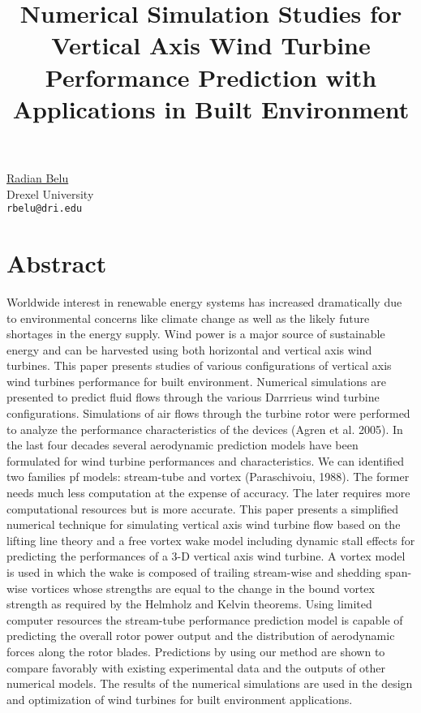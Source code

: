 \title{Numerical Simulation Studies for Vertical Axis Wind Turbine Performance Prediction with Applications in Built Environment}
\author{} \institute{}
\maketitle

\begin{center}
{\large \underline{Radian Belu}}\\
Drexel University\\
{\tt rbelu@dri.edu}
\end{center}

\section*{Abstract}
Worldwide interest in renewable energy systems has increased dramatically due to environmental concerns like climate change as well as the likely future shortages in the energy supply. Wind power is a major source of sustainable energy and can be harvested using both horizontal and vertical axis wind turbines. This paper presents studies of various configurations of vertical axis wind turbines performance for built environment. Numerical simulations are presented to predict fluid flows through the various Darrrieus wind turbine configurations. Simulations of air flows through the turbine rotor were performed to analyze the performance characteristics of the devices (Agren et al. 2005). In the last four decades several aerodynamic prediction models have been formulated for wind turbine performances and characteristics. We can identified two families pf models: stream-tube and vortex (Paraschivoiu, 1988). The former needs much less computation at the expense of accuracy. The later requires more computational resources but is more accurate. This paper presents a simplified numerical technique for simulating vertical axis wind turbine flow based on the lifting line theory and a free vortex wake model including dynamic stall effects for predicting the performances of a 3-D vertical axis wind turbine. A vortex model is used in which the wake is composed of trailing stream-wise and shedding span-wise vortices whose strengths are equal to the change in the bound vortex strength as required by the Helmholz and Kelvin theorems. Using limited computer resources the stream-tube performance prediction model is capable of predicting the overall rotor power output and the distribution of aerodynamic forces along the rotor blades. Predictions by using our method are shown to compare favorably with existing experimental data and the outputs of other numerical models. The results of the numerical simulations are used in the design and optimization of wind turbines for built environment applications.     

